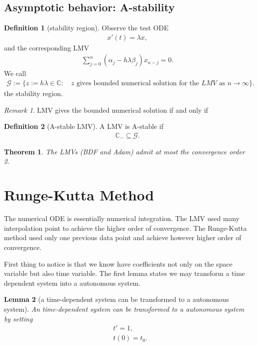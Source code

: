 \documentclass[a4paper,12pt,oneside,fleqn]{book}
\newtheorem{theorem}{Theorem}[section]
\newtheorem{lemma}[theorem]{Lemma}
\theoremstyle{definition}
\newtheorem{definition}{Definition}[section]
\theoremstyle{remark}
\newtheorem*{remark}{Remark}
\begin{document}
\subsection{Asymptotic behavior: A-stability}
\begin{definition}[stability region]
	Observe the test ODE
\begin{align*}
	x'(t) = \lambda x,
\end{align*}
and the corresponding LMV
\begin{align*}
	\sum_{j = 0}^n (\alpha_j - h \lambda \beta_j)x_{n - j} = 0. 
\end{align*}
We call
\begin{align*}
	\mathcal{G}:= \{z := h \lambda \in \mathbb{C}: \quad \text{$z$ gives bounded numerical solution for the $LMV$ as $n \rightarrow \infty$}\}.
\end{align*}
the stability region. 
\end{definition}
\begin{remark}
LMV gives the bounded numerical solution if and only if 
\end{remark}

\begin{definition}[A-stable LMV]
	A LMV is A-stable if 
	\begin{align*}
		\mathbb{C}_- \subseteq \mathcal{G}.
	\end{align*}
\end{definition}


\begin{theorem}
	The LMVs (BDF and Adam) admit at most the convergence order 2. 
\end{theorem}



\section{Runge-Kutta Method}
The numerical ODE is essentially numerical integration. The LMV used many interpolation point to achieve the higher order of convergence. The Runge-Kutta method used only one previous data point and achieve however higher order of convergence. \par 
First thing to notice is that we know have coefficients not only on the space variable but also time variable. The first lemma states we may transform a time dependent system into a autonomous system.

\begin{lemma}[a time-dependent system can be transformed to a autonomous system]
	An time-dependent system can be transformed to a autonomous system by setting 
	\begin{align*}
		& t' = 1,\\
		& t(0) = t_0.
	\end{align*} 
\end{lemma}
\end{document}
